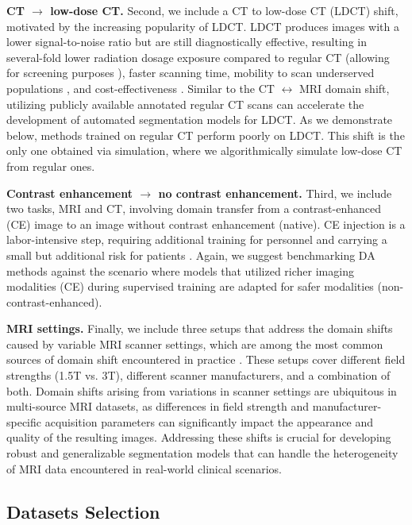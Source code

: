 \textbf{CT $\rightarrow$ low-dose CT.} Second, we include a CT to low-dose CT (LDCT) shift, motivated by the increasing popularity of LDCT. LDCT produces images with a lower signal-to-noise ratio but are still diagnostically effective, resulting in several-fold lower radiation dosage exposure compared to regular CT (allowing for screening purposes \cite{lidc,kubo2016standard}), faster scanning time, mobility to scan underserved populations \cite{raghavan2020initial}, and cost-effectiveness \cite{mohammadshahi2019cost}. Similar to the CT $\leftrightarrow$ MRI domain shift, utilizing publicly available annotated regular CT scans can accelerate the development of automated segmentation models for LDCT. As we demonstrate below, methods trained on regular CT perform poorly on LDCT. This shift is the only one obtained via simulation, where we algorithmically simulate low-dose CT from regular ones.


\textbf{Contrast enhancement $\rightarrow$ no contrast enhancement.} Third, we include two tasks, MRI and CT, involving domain transfer from a contrast-enhanced (CE) image to an image without contrast enhancement (native). CE injection is a labor-intensive step, requiring additional training for personnel and carrying a small but additional risk for patients \cite{andreucci2014side,costelloe2020risks}. Again, we suggest benchmarking DA methods against the scenario where models that utilized richer imaging modalities (CE) during supervised training are adapted for safer modalities (non-contrast-enhanced).


\textbf{MRI settings.} Finally, we include three setups that address the domain shifts caused by variable MRI scanner settings, which are among the most common sources of domain shift encountered in practice \cite{yan2020mri,medim_da_survey_2023}. These setups cover different field strengths (1.5T vs. 3T), different scanner manufacturers, and a combination of both. Domain shifts arising from variations in scanner settings are ubiquitous in multi-source MRI datasets, as differences in field strength and manufacturer-specific acquisition parameters can significantly impact the appearance and quality of the resulting images. Addressing these shifts is crucial for developing robust and generalizable segmentation models that can handle the heterogeneity of MRI data encountered in real-world clinical scenarios.



\subsection{Datasets Selection}


